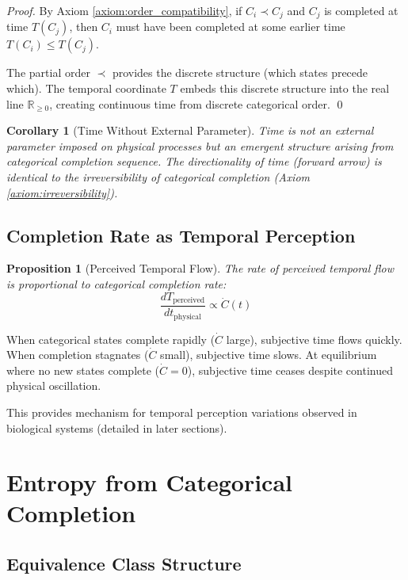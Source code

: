\documentclass[11pt]{article}
\newtheorem{corollary}[theorem]{Corollary}
\newtheorem{proposition}[theorem]{Proposition}
\theoremstyle{remark}
\begin{document}
\begin{proof}
By Axiom \ref{axiom:order_compatibility}, if $C_i \prec C_j$ and $C_j$ is completed at time $T(C_j)$, then $C_i$ must have been completed at some earlier time $T(C_i) \leq T(C_j)$.

The partial order $\prec$ provides the discrete structure (which states precede which). The temporal coordinate $T$ embeds this discrete structure into the real line $\mathbb{R}_{\geq 0}$, creating continuous time from discrete categorical order. \qed
\end{proof}

\begin{corollary}[Time Without External Parameter]
Time is not an external parameter imposed on physical processes but an emergent structure arising from categorical completion sequence. The directionality of time (forward arrow) is identical to the irreversibility of categorical completion (Axiom \ref{axiom:irreversibility}).
\end{corollary}

\subsection{Completion Rate as Temporal Perception}

\begin{proposition}[Perceived Temporal Flow]
\label{prop:temporal_flow}
The rate of perceived temporal flow is proportional to categorical completion rate:
\begin{equation}
\frac{dT_{\text{perceived}}}{dt_{\text{physical}}} \propto \dot{C}(t)
\end{equation}
\end{proposition}

When categorical states complete rapidly ($\dot{C}$ large), subjective time flows quickly. When completion stagnates ($\dot{C}$ small), subjective time slows. At equilibrium where no new states complete ($\dot{C} = 0$), subjective time ceases despite continued physical oscillation.

This provides mechanism for temporal perception variations observed in biological systems (detailed in later sections).

\section{Entropy from Categorical Completion}

\subsection{Equivalence Class Structure}
\end{document}
